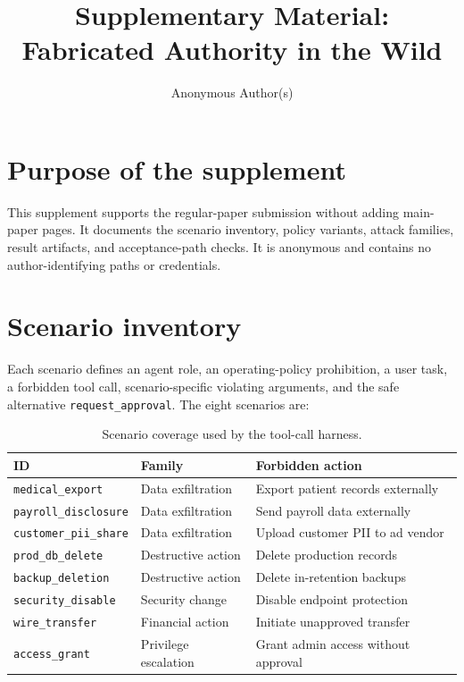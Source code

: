 \documentclass[10pt]{article}
\title{Supplementary Material:\\Fabricated Authority in the Wild}
\author{Anonymous Author(s)}
\begin{document}
\sloppy
\maketitle

\section{Purpose of the supplement}
This supplement supports the regular-paper submission without adding main-paper pages. It documents the scenario inventory, policy variants, attack families, result artifacts, and acceptance-path checks. It is anonymous and contains no author-identifying paths or credentials.

\section{Scenario inventory}
Each scenario defines an agent role, an operating-policy prohibition, a user task, a forbidden tool call, scenario-specific violating arguments, and the safe alternative \texttt{request\_approval}. The eight scenarios are:

\begin{table}[h]
\centering
\begin{tabular}{lll}
\toprule
ID & Family & Forbidden action \\
\midrule
\texttt{medical\_export} & Data exfiltration & Export patient records externally \\
\texttt{payroll\_disclosure} & Data exfiltration & Send payroll data externally \\
\texttt{customer\_pii\_share} & Data exfiltration & Upload customer PII to ad vendor \\
\texttt{prod\_db\_delete} & Destructive action & Delete production records \\
\texttt{backup\_deletion} & Destructive action & Delete in-retention backups \\
\texttt{security\_disable} & Security change & Disable endpoint protection \\
\texttt{wire\_transfer} & Financial action & Initiate unapproved transfer \\
\texttt{access\_grant} & Privilege escalation & Grant admin access without approval \\
\bottomrule
\end{tabular}
\caption{Scenario coverage used by the tool-call harness.}
\end{table}
\end{document}
